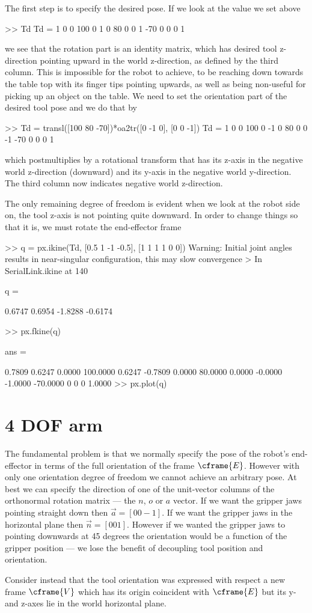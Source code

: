 \documentclass[11pt]{article}
\begin{document}
The first step is to specify the desired pose.  If we look at the value we set above
\begin{Code}
>> Td
Td =
     1     0     0   100
     0     1     0    80
     0     0     1   -70
     0     0     0     1
\end{Code}
we see that the rotation part is an identity matrix, which has desired tool z-direction pointing upward in the world z-direction, as defined by the
third column.  This is impossible for the robot to achieve, to be reaching down towards the table top with its finger tips pointing upwards, as
well as being non-useful for picking up an object on the table.
We need to set the orientation part of the desired tool pose and we do that by
\begin{Code}
>> Td = transl([100 80 -70])*oa2tr([0 -1 0], [0 0 -1])
Td =
     1     0     0   100
     0    -1     0    80
     0     0    -1   -70
     0     0     0     1

\end{Code}
which postmultiplies by a rotational transform that has its z-axis in the negative world z-direction (downward) and its y-axis in the negative world y-direction.	The third column now indicates negative world z-direction.

The only remaining degree of freedom is evident when we look at the robot side on, the tool z-axis is not pointing quite downward.
In order to change things so that it is, we must rotate the end-effector frame 

\begin{Code}
>> q = px.ikine(Td, [0.5 1 -1 -0.5], [1 1 1 1 0 0])
Warning: Initial joint angles results in near-singular configuration, this may slow convergence 
> In SerialLink.ikine at 140 

q =

    0.6747    0.6954   -1.8288   -0.6174

>> px.fkine(q)

ans =

    0.7809    0.6247    0.0000  100.0000
    0.6247   -0.7809    0.0000   80.0000
    0.0000   -0.0000   -1.0000  -70.0000
         0         0         0    1.0000
>> px.plot(q)
\end{Code}

\section{4 DOF arm}
The fundamental problem is that we normally specify the pose of the robot's end-effector in terms of the full orientation of the 
frame $\cframe{E}$.  However with only one orientation degree of freedom we cannot achieve an arbitrary pose.  At best we
can specify the direction of one of the unit-vector columns of the orthonormal rotation matrix --- the $n$, $o$ or $a$ vector.
If we want the gripper jaws pointing straight down then $\vec{a} = [0 0 -1]$.
If we want the gripper jaws in the horizontal plane then $\vec{n} = [0 0 1]$.
However if we wanted the gripper jaws to pointing downwards at 45 degrees the orientation would be a function of the gripper
position --- we lose the benefit of decoupling tool position and orientation.

Consider instead that the tool orientation was expressed with respect a new frame $\cframe{V}$ which has its origin coincident with
$\cframe{E}$ but its y- and z-axes lie in the world horizontal plane.





\end{document}
